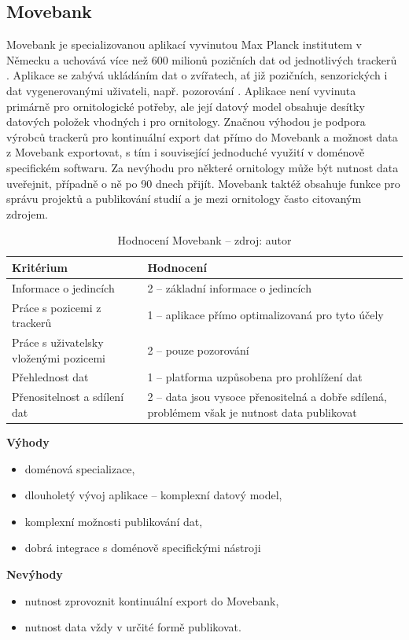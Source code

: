\subsection{Movebank}

Movebank je specializovanou aplikací vyvinutou Max Planck institutem v Německu a uchovává více než 600 milionů pozičních dat od jednotlivých trackerů  \cite{mrozewski2018movebank}. Aplikace se zabývá ukládáním dat o zvířatech, ať již pozičních, senzorických i dat vygenerovanými uživateli, např. pozorování \cite{kranstauber2011movebank}. Aplikace není vyvinuta primárně pro ornitologické potřeby, ale její datový model obsahuje desítky datových položek vhodných i pro ornitology. Značnou výhodou je podpora výrobců trackerů pro kontinuální export dat přímo do Movebank a možnost data z Movebank exportovat, s tím i související jednoduché využití v doménově specifickém softwaru. Za nevýhodu pro některé ornitology může být nutnost data uveřejnit, případně o ně po 90 dnech přijít. Movebank taktéž obsahuje funkce pro správu projektů a publikování studií a je mezi ornitology často citovaným zdrojem.

\begin{table}[H]
	\begin{tabularx}{\textwidth}{ | X | X | }
		\hline
		Kritérium                              & Hodnocení \\
		\hline			
		Informace o jedincích                  & 2 -- základní informace o jedincích          \\
		\hline
		Práce s pozicemi z trackerů            & 1 -- aplikace přímo optimalizovaná pro tyto účely          \\
		\hline
		Práce s uživatelsky vloženými pozicemi & 2 -- pouze pozorování          \\
		\hline
		Přehlednost dat                        & 1 -- platforma uzpůsobena pro prohlížení dat          \\
		\hline
		Přenositelnost a sdílení dat           & 2 -- data jsou vysoce přenositelná a dobře sdílená, problémem však je nutnost data publikovat          \\
		\hline	
	\end{tabularx}
	\caption[Hodnocení Movebank]{Hodnocení Movebank -- zdroj: autor}
\end{table}

\textbf{Výhody}
\nolisttopbreak
\begin{itemize}
	\item doménová specializace,
	\item dlouholetý vývoj aplikace -- komplexní datový model,
	\item komplexní možnosti publikování dat,
	\item dobrá integrace s doménově specifickými nástroji
\end{itemize}
\textbf{Nevýhody}
\nolisttopbreak
\begin{itemize}
	\item nutnost zprovoznit kontinuální export do Movebank,
	\item nutnost data vždy v určité formě publikovat.
\end{itemize}

